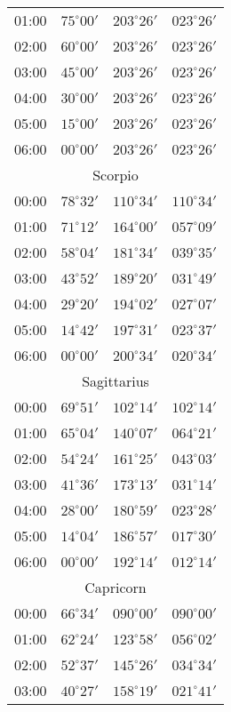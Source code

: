 \begin{table}
\begin{Parallel}{}{}
{{\begin{tabular}{l|lll}
01:00 & $75^\circ 00'$ & $203^\circ 26'$& $023^\circ 26'$ \\
02:00 & $60^\circ 00'$ & $203^\circ 26'$& $023^\circ 26'$ \\
03:00 & $45^\circ 00'$ & $203^\circ 26'$& $023^\circ 26'$ \\
04:00 & $30^\circ 00'$ & $203^\circ 26'$& $023^\circ 26'$ \\
05:00 & $15^\circ 00'$ & $203^\circ 26'$& $023^\circ 26'$ \\
06:00 & $00^\circ 00'$ & $203^\circ 26'$& $023^\circ 26'$ \\
\multicolumn{4}{c}{Scorpio}\\
00:00 & $78^\circ 32'$ & $110^\circ 34'$& $110^\circ 34'$ \\
01:00 & $71^\circ 12'$ & $164^\circ 00'$& $057^\circ 09'$ \\
02:00 & $58^\circ 04'$ & $181^\circ 34'$& $039^\circ 35'$ \\
03:00 & $43^\circ 52'$ & $189^\circ 20'$& $031^\circ 49'$ \\
04:00 & $29^\circ 20'$ & $194^\circ 02'$& $027^\circ 07'$ \\
05:00 & $14^\circ 42'$ & $197^\circ 31'$& $023^\circ 37'$ \\
06:00 & $00^\circ 00'$ & $200^\circ 34'$& $020^\circ 34'$ \\
\multicolumn{4}{c}{Sagittarius}\\
00:00 & $69^\circ 51'$ & $102^\circ 14'$& $102^\circ 14'$ \\
01:00 & $65^\circ 04'$ & $140^\circ 07'$& $064^\circ 21'$ \\
02:00 & $54^\circ 24'$ & $161^\circ 25'$& $043^\circ 03'$ \\
03:00 & $41^\circ 36'$ & $173^\circ 13'$& $031^\circ 14'$ \\
04:00 & $28^\circ 00'$ & $180^\circ 59'$& $023^\circ 28'$ \\
05:00 & $14^\circ 04'$ & $186^\circ 57'$& $017^\circ 30'$ \\
06:00 & $00^\circ 00'$ & $192^\circ 14'$& $012^\circ 14'$ \\
\multicolumn{4}{c}{Capricorn}\\
00:00 & $66^\circ 34'$ & $090^\circ 00'$& $090^\circ 00'$ \\
01:00 & $62^\circ 24'$ & $123^\circ 58'$& $056^\circ 02'$ \\
02:00 & $52^\circ 37'$ & $145^\circ 26'$& $034^\circ 34'$ \\
03:00 & $40^\circ 27'$ & $158^\circ 19'$& $021^\circ 41'$ \\

\end{tabular}}}
\end{Parallel}
\end{table}
